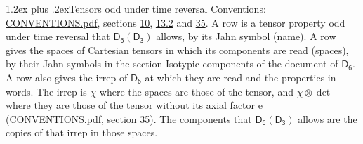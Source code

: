 \documentclass[10pt,a4paper]{article}
\makeatletter
\renewcommand\section{\@startsection{section}{1}{\z@}{-3ex plus -1ex minus -.2ex}%
  {1.2ex plus .2ex}{\normalfont\large\sffamily\bfseries\color{parttitle}}}
\numberwithin{equation}{section}
\newcommand{\grp}[1]{\mathsf{#1}}
\newcommand{\irrprod}{\otimes}
\makeatother
\begin{document}
\section{Tensors odd under time reversal}\label{s:time_odd}
Conventions: \href{../../CONVENTIONS.pdf}{CONVENTIONS.pdf}, sections \href{../../../rotation/CONVENTIONS.pdf\#conv.10}{10}, \href{../../../rotation/CONVENTIONS.pdf\#conv.13.2}{13.2} and \href{../../CONVENTIONS.pdf\#conv.35}{35}.
\leavevmode\label{n:head.name.property}A row is a tensor property odd under time reversal that $\grp{D_{6}}(\grp{D_{3}})$ allows, by its Jahn symbol (name). \label{n:head.spaces}A row gives the spaces of Cartesian tensors in which its components are read (spaces), by their Jahn symbols in the section Isotypic components of the document of \href{../../../rotation/data/pdf/D6.pdf}{$\grp{D_{6}}$}. \label{n:head.properties}A row also gives the irrep of $\grp{D_{6}}$ at which they are read and the properties in words. The irrep is $\chi$ where the spaces are those of the tensor, and $\chi \irrprod \det$ where they are those of the tensor without its axial factor e (\href{../../CONVENTIONS.pdf}{CONVENTIONS.pdf}, section \href{../../CONVENTIONS.pdf\#conv.35}{35}). The components that $\grp{D_{6}}(\grp{D_{3}})$ allows are the copies of that irrep in those spaces.
\end{document}
